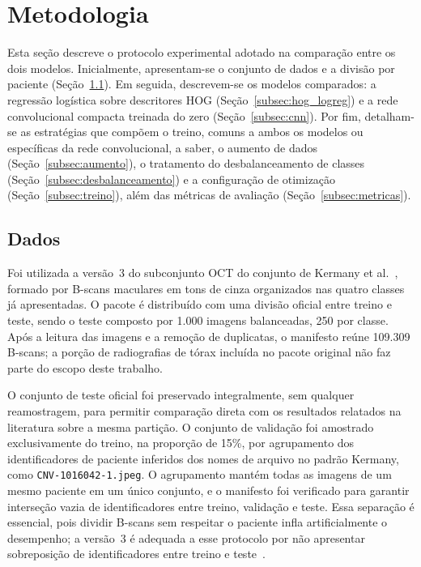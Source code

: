 \documentclass[conference]{IEEEtran}
\begin{document}
\section{Metodologia}
\label{sec:metodologia}

Esta seção descreve o protocolo experimental adotado na comparação entre os dois modelos. Inicialmente, apresentam-se o conjunto de dados e a divisão por paciente (Seção~\ref{subsec:dados}). Em seguida, descrevem-se os modelos comparados: a regressão logística sobre descritores HOG (Seção~\ref{subsec:hog_logreg}) e a rede convolucional compacta treinada do zero (Seção~\ref{subsec:cnn}). Por fim, detalham-se as estratégias que compõem o treino, comuns a ambos os modelos ou específicas da rede convolucional, a saber, o aumento de dados (Seção~\ref{subsec:aumento}), o tratamento do desbalanceamento de classes (Seção~\ref{subsec:desbalanceamento}) e a configuração de otimização (Seção~\ref{subsec:treino}), além das métricas de avaliação (Seção~\ref{subsec:metricas}).

\subsection{Dados}
\label{subsec:dados}

Foi utilizada a versão~3 do subconjunto OCT do conjunto de Kermany et al.~\cite{kermany_dataset}, formado por B-scans maculares em tons de cinza organizados nas quatro classes já apresentadas. O pacote é distribuído com uma divisão oficial entre treino e teste, sendo o teste composto por 1.000 imagens balanceadas, 250 por classe. Após a leitura das imagens e a remoção de duplicatas, o manifesto reúne 109.309 B-scans; a porção de radiografias de tórax incluída no pacote original não faz parte do escopo deste trabalho.

O conjunto de teste oficial foi preservado integralmente, sem qualquer reamostragem, para permitir comparação direta com os resultados relatados na literatura sobre a mesma partição. O conjunto de validação foi amostrado exclusivamente do treino, na proporção de 15\%, por agrupamento dos identificadores de paciente inferidos dos nomes de arquivo no padrão Kermany, como \texttt{CNV-1016042-1.jpeg}. O agrupamento mantém todas as imagens de um mesmo paciente em um único conjunto, e o manifesto foi verificado para garantir interseção vazia de identificadores entre treino, validação e teste. Essa separação é essencial, pois dividir B-scans sem respeitar o paciente infla artificialmente o desempenho; a versão~3 é adequada a esse protocolo por não apresentar sobreposição de identificadores entre treino e teste~\cite{tampu2022}.
\end{document}
